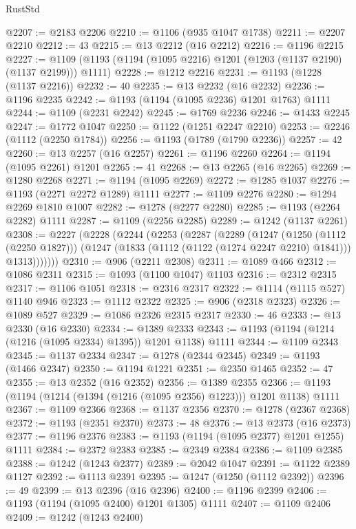 \begin{lexlean}{RustStd}
\begin{coremodule}
@2207 := @2183 @2206
@2210 := @1106 (@935 @1047 @1738)
@2211 := @2207 @2210
@2212 := 43
@2215 := @13 @2212 (@16 @2212)
@2216 := @1196 @2215
@2227 := @1109 (@1193 (@1194 (@1095 @2216) @1201 (@1203 (@1137 @2190) (@1137 @2199))) @1111)
@2228 := @1212 @2216
@2231 := @1193 (@1228 (@1137 @2216))
@2232 := 40
@2235 := @13 @2232 (@16 @2232)
@2236 := @1196 @2235
@2242 := @1193 (@1194 (@1095 @2236) @1201 @1763) @1111
@2244 := @1109 (@2231 @2242)
@2245 := @1769 @2236
@2246 := @1433 @2245
@2247 := @1772 @1047
@2250 := @1122 (@1251 @2247 @2210)
@2253 := @2246 (@1112 (@2250 @1784))
@2256 := @1193 (@1789 (@1790 @2236))
@2257 := 42
@2260 := @13 @2257 (@16 @2257)
@2261 := @1196 @2260
@2264 := @1194 (@1095 @2261) @1201
@2265 := 41
@2268 := @13 @2265 (@16 @2265)
@2269 := @1280 @2268
@2271 := @1194 (@1095 @2269)
@2272 := @1285 @1037
@2276 := @1193 (@2271 @2272 @1289) @1111
@2277 := @1109 @2276
@2280 := @1294 @2269 @1810 @1007
@2282 := @1278 (@2277 @2280)
@2285 := @1193 (@2264 @2282) @1111
@2287 := @1109 (@2256 @2285)
@2289 := @1242 (@1137 @2261)
@2308 := @2227
    (@2228
      (@2244
        (@2253
          (@2287
            (@2289
              (@1247
                (@1250 (@1112 (@2250 @1827)))
                (@1247 (@1833 (@1112 (@1122 (@1274 @2247 @2210) @1841))) @1313)))))))
@2310 := @906 (@2211 @2308)
@2311 := @1089 @466
@2312 := @1086 @2311
@2315 := @1093 (@1100 @1047) @1103
@2316 := @2312 @2315
@2317 := @1106 @1051
@2318 := @2316 @2317
@2322 := @1114 (@1115 @527) @1140 @946
@2323 := @1112 @2322
@2325 := @906 (@2318 @2323)
@2326 := @1089 @527
@2329 := @1086 @2326 @2315 @2317
@2330 := 46
@2333 := @13 @2330 (@16 @2330)
@2334 := @1389 @2333
@2343 := @1193 (@1194 (@1214 (@1216 (@1095 @2334) @1395)) @1201 @1138) @1111
@2344 := @1109 @2343
@2345 := @1137 @2334
@2347 := @1278 (@2344 @2345)
@2349 := @1193 (@1466 @2347)
@2350 := @1194 @1221
@2351 := @2350 @1465
@2352 := 47
@2355 := @13 @2352 (@16 @2352)
@2356 := @1389 @2355
@2366 := @1193 (@1194 (@1214 (@1394 (@1216 (@1095 @2356) @1223))) @1201 @1138) @1111
@2367 := @1109 @2366
@2368 := @1137 @2356
@2370 := @1278 (@2367 @2368)
@2372 := @1193 (@2351 @2370)
@2373 := 48
@2376 := @13 @2373 (@16 @2373)
@2377 := @1196 @2376
@2383 := @1193 (@1194 (@1095 @2377) @1201 @1255) @1111
@2384 := @2372 @2383
@2385 := @2349 @2384
@2386 := @1109 @2385
@2388 := @1242 (@1243 @2377)
@2389 := @2042 @1047
@2391 := @1122 @2389 @1127
@2392 := @1113 @2391
@2395 := @1247 (@1250 (@1112 @2392))
@2396 := 49
@2399 := @13 @2396 (@16 @2396)
@2400 := @1196 @2399
@2406 := @1193 (@1194 (@1095 @2400) @1201 @1305) @1111
@2407 := @1109 @2406
@2409 := @1242 (@1243 @2400)

\end{coremodule}
\end{lexlean}
